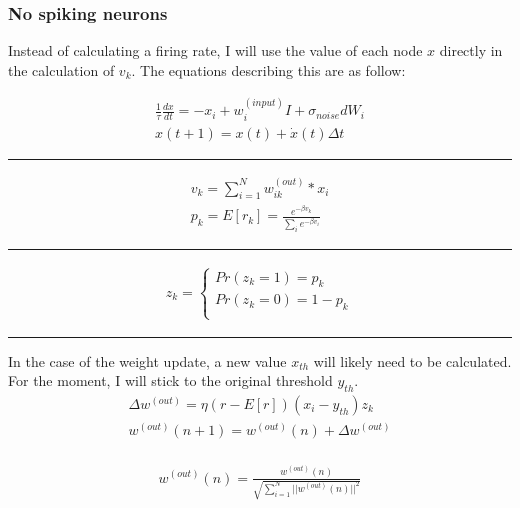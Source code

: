 \documentclass[11pt]{article}
\begin{document}
\hypertarget{no-spiking-neurons}{%
\subsubsection{No spiking neurons}\label{no-spiking-neurons}}

Instead of calculating a firing rate, I will use the value of each node
\(x\) directly in the calculation of \(v_k\). The equations describing
this are as follow:

\begin{align}
\frac{1}{\tau} \frac{dx}{dt}= -x_i + w_i^{(input)}I + \sigma_{noise}dW_i \\
x(t + 1) = x(t) + \dot{x}(t)\Delta t
\end{align}

\begin{center}\rule{0.5\linewidth}{\linethickness}\end{center}

\begin{align}
v_k = \sum_{i=1}^N w_{ik}^{(out)} * x_i \\
p_k = E[r_k] = \frac{e^{-\beta v_k}}{\sum_i e^{-\beta v_i}}
\end{align}

\begin{center}\rule{0.5\linewidth}{\linethickness}\end{center}

\begin{align}
z_k=   \left\{
\begin{array}{ll}
      Pr(z_k=1) = p_k   \\
      Pr(z_k=0) = 1-p_k  \\
\end{array} 
\right.
\end{align}

\begin{center}\rule{0.5\linewidth}{\linethickness}\end{center}

In the case of the weight update, a new value \(x_{th}\) will likely
need to be calculated. For the moment, I will stick to the original
threshold \(y_{th}\). \begin{align}
\Delta w^{(out)} = \eta (r - E[r]) (x_i - y_{th}) z_k \\
w^{(out)}(n + 1) = w^{(out)}(n) + \Delta w^{(out)} \\
\end{align}

\begin{align}
w^{(out)}(n) = \frac{w^{(out)}(n)}{\sqrt{\sum_{i=1}^N ||w^{(out)}(n)||^2}}
\end{align}
\end{document}

